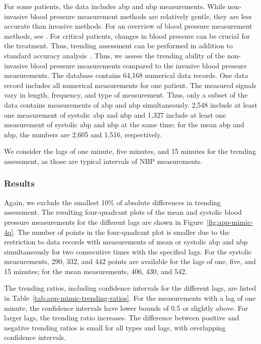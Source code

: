 For some patients, the data includes \ac{abp} and \ac{nbp} measurements.
While non-invasive blood pressure measurement methods are relatively gentle, they are less accurate than invasive methods.
For an overview of blood pressure measurement methods, see \textcite{Saugel2014}.
For critical patients, changes in blood pressure can be crucial for the treatment.
Thus, trending assessment can be performed in addition to standard accuracy analysis~\parencite[see, for example, ]{Mostafa2020}.
Thus, we assess the trending ability of the non-invasive blood pressure measurements compared to the invasive blood pressure measurements.
The database contains 64,168 numerical data records.
One data record includes all numerical measurements for one patient.
The measured signals vary in length, frequency, and type of measurement.
Thus, only a subset of the data contains measurements of \ac{abp} and \ac{nbp} simultaneously.
2,548 include at least one measurement of systolic \ac{abp} and \ac{nbp} and 1,327 include at least one measurement of systolic \ac{abp} and \ac{nbp} at the same time; for the mean \ac{abp} and \ac{nbp}, the numbers are 2,605 and 1,516, respectively.

We consider the lags of one minute, five minutes, and 15 minutes for the trending assessment, as those are typical intervals of NBP measurements.

\subsubsection*{Results}

Again, we exclude the smallest 10\% of absolute differences in trending assessment.
The resulting four-quadrant plots of the mean and systolic blood pressure measurements for the different lags are shown in Figure~\ref{fig:app-mimic-4q}.
The number of points in the four-quadrant plot is smaller due to the restriction to data records with measurements of mean or systolic \ac{abp} and \ac{nbp} simultaneously for two consecutive times with the specified lags.
For the systolic measurements, 290, 332, and 442 points are available for the lags of one, five, and 15 minutes; for the mean measurements, 406, 430, and 542.

The trending ratios, including confidence intervals for the different lags, are listed in Table~\ref{tab:app-mimic-trending-ratios}.
For the measurements with a lag of one minute, the confidence intervals have lower bounds of 0.5 or slightly above.
For larger lags, the trending ratio increases.
The difference between positive and negative trending ratios is small for all types and lags, with overlapping confidence intervals.

